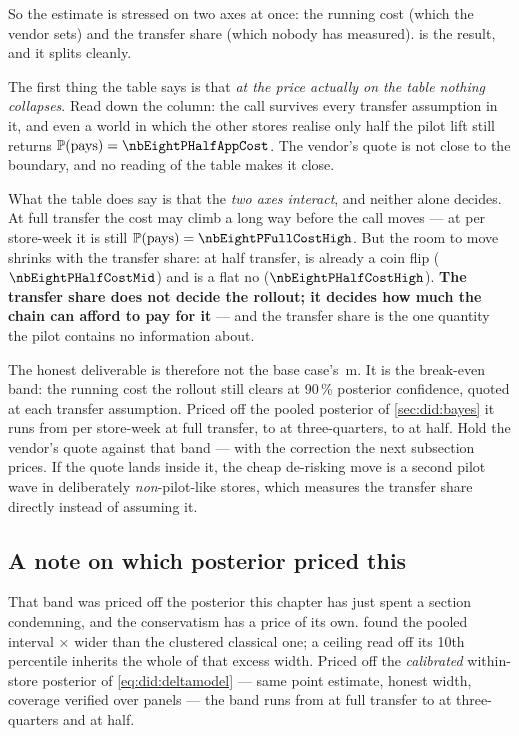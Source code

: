 So the estimate is stressed on two axes at once: the running cost (which the vendor sets) and the
transfer share (which nobody has measured).  is the result, and it splits
cleanly.



The first thing the table says is that \emph{at the price actually on the table nothing collapses}.
Read down the \eur{\nbEightAppCost} column: the call survives every transfer assumption in it, and
even a world in which the other \nbEightNOther{} stores realise only half the pilot lift still
returns $\Prob(\text{pays}) = \nbEightPHalfAppCost$. The vendor's quote is not close to the
boundary, and no reading of the table makes it close.

What the table does say is that the \emph{two axes interact}, and neither alone decides. At full
transfer the cost may climb a long way before the call moves --- at \eur{\nbEightCostHigh} per
store-week it is still $\Prob(\text{pays}) = \nbEightPFullCostHigh$. But the room to move shrinks
with the transfer share: at half transfer, \eur{\nbEightCostMid} is already a coin flip
($\nbEightPHalfCostMid$) and \eur{\nbEightCostHigh} is a flat no ($\nbEightPHalfCostHigh$).
\textbf{The transfer share does not decide the rollout; it decides how much the chain can afford to
pay for it} --- and the transfer share is the one quantity the pilot contains no information about.

The honest deliverable is therefore not the base case's \eur{\nbEightAnnualMeanM}\,m. It is the
break-even band: the running cost the rollout still clears at 90\,\% posterior confidence, quoted at
each transfer assumption. Priced off the pooled posterior of \cref{sec:did:bayes} it runs from
\eur{\nbEightCapFull} per store-week at full transfer, to \eur{\nbEightCapThreeQuarter} at
three-quarters, to \eur{\nbEightCapHalf} at half. Hold the vendor's quote against that band --- with
the correction the next subsection prices. If the quote lands inside it, the cheap de-risking move
is a second pilot wave in deliberately \emph{non}-pilot-like stores, which measures the transfer
share directly instead of assuming it.

\subsection*{A note on which posterior priced this}

That band was priced off the posterior this chapter has just spent a section condemning, and the
conservatism has a price of its own.  found the pooled interval
\nbEightBayesOverCluster$\times$ wider than the clustered classical one; a ceiling read off its 10th
percentile inherits the whole of that excess width. Priced off the \emph{calibrated} within-store
posterior of \cref{eq:did:deltamodel} --- same point estimate, honest width, coverage verified over
\nbEightSeedN{} panels --- the band runs from \eur{\nbEightCapFullFe} at full transfer to
\eur{\nbEightCapThreeQuarterFe} at three-quarters and \eur{\nbEightCapHalfFe} at half.

